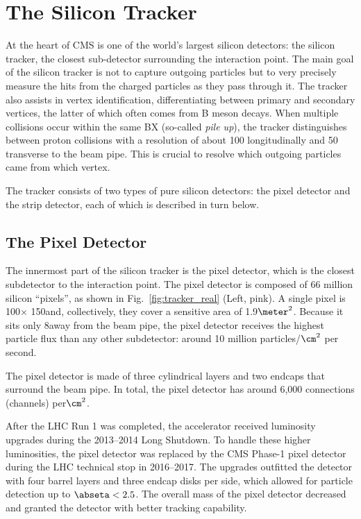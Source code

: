 \section{The Silicon Tracker}
\label{sec:tracker}

At the heart of CMS is one of the world's largest silicon detectors: the silicon tracker, the closest sub-detector surrounding the interaction point.
The main goal of the silicon tracker is not to capture outgoing particles but to very precisely measure the hits from the charged particles as they pass through it.
The tracker also assists in vertex identification, differentiating between primary and secondary vertices, the latter of which often comes from B meson decays.
When multiple \pp collisions occur within the same BX (so-called \emph{pile up}), the tracker distinguishes between proton collisions with a resolution of about 100 \mum longitudinally and 50 \mum transverse to the beam pipe.
This is crucial to resolve which outgoing particles came from which \pp vertex.

The tracker consists of two types of pure silicon detectors: the pixel detector and the strip detector, each of which is described in turn below.


\subsection{The Pixel Detector}
\label{sec:pixel}

The innermost part of the silicon tracker is the pixel detector, which is the closest subdetector to the interaction point.
The pixel detector is composed of 66 million silicon ``pixels'', as shown in Fig.~\ref{fig:tracker_real} (Left, pink).
A single pixel is 100\mum $\times$ 150\mum and, collectively, they cover a sensitive area of 1.9$\meter^2$.
Because it sits only 8\cm away from the beam pipe, the pixel detector receives the highest particle flux than any other subdetector:
around 10 million particles/$\cm^2$ per second.

The pixel detector is made of three cylindrical layers and two endcaps that surround the beam pipe.
In total, the pixel detector has around 6,000 connections (channels) per$\cm^2$.

After the LHC Run 1 was completed, the accelerator received luminosity upgrades during the 2013--2014 Long Shutdown.
To handle these higher luminosities, the pixel detector was replaced by the CMS Phase-1 pixel detector during the LHC technical stop in 2016--2017.
The upgrades outfitted the detector with four barrel layers and three endcap disks per side, which allowed for particle detection up to $\abseta < 2.5$.
The overall mass of the pixel detector decreased and granted the detector with better tracking capability.


